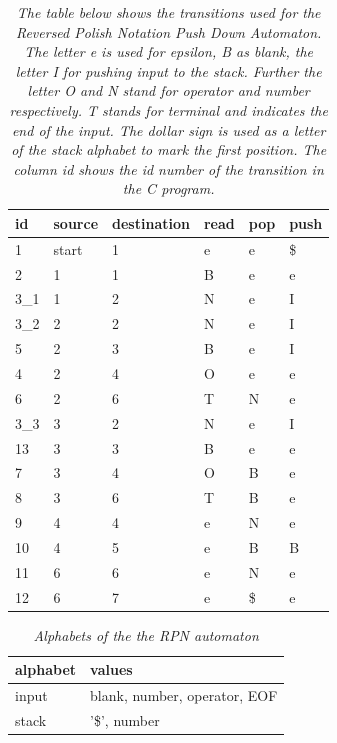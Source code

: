 \documentclass[a4paper,11pt,twoside]{article}
\begin{document}
\begin{table}[]
\centering
\caption{\textit{The table below shows the transitions used for the Reversed
  Polish Notation Push Down Automaton. The letter \textit{e} is used
  for \textit{epsilon}, \textit{B} as \textit{blank}, the letter
  \textit{I} for pushing \textit{input} to the stack. Further the
  letter \textit{O} and \textit{N} stand for \textit{operator} and
  \textit{number} respectively. \textit{T} stands for \textit{terminal} 
  and indicates the end of the input. The dollar sign is used as a
  letter of the stack alphabet to mark the first position. The column
  \textit{id} shows the id number of the transition in the C program.}}
\label{tab:trans}
\begin{tabular}{llllll}
id  & source & destination & read & pop & push \\ \hline
1   & start  & 1           & e    & e   & \$    \\
2   & 1      & 1           & B    & e   & e    \\
3\_1 & 1      & 2           & N    & e   & I    \\
3\_2 & 2      & 2           & N    & e   & I    \\
5   & 2      & 3           & B    & e   & I    \\
4   & 2      & 4           & O    & e   & e    \\
6   & 2      & 6           & T    & N   & e    \\
3\_3 & 3      & 2           & N    & e   & I    \\
13  & 3      & 3           & B    & e   & e    \\
7   & 3      & 4           & O    & B   & e    \\
8   & 3      & 6           & T    & B   & e    \\
9   & 4      & 4           & e    & N   & e    \\
10  & 4      & 5           & e    & B   & B    \\
11  & 6      & 6           & e    & N   & e    \\
12  & 6      & 7           & e    & \$   & e   
\end{tabular}
\end{table}

\begin{table}[]
\centering
\caption{\textit{Alphabets of the the RPN automaton}}
\label{tab:alphabets}
\begin{tabular}{ll}
alphabet & values                                   \\ \hline
input    & blank, number, operator, EOF \\
stack    & '\$', number                
\end{tabular}
\end{table}
\end{document}
